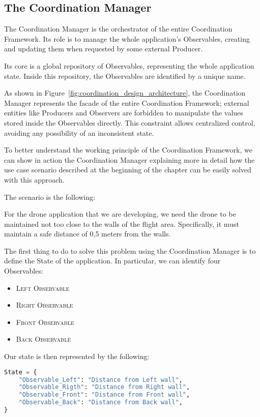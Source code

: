 \subsection{The Coordination Manager}\label{subsec:coordination_manager}

The Coordination Manager is the orchestrator of the entire Coordination Framework. 
Its role is to manage the whole application's Observables, creating and updating them when requested by some external Producer.

Its core is a global repository of Observables, representing the whole application state. 
Inside this repository, the Observables are identified by a unique name. 

As shown in Figure~\ref{fig:coordination_design_architecture}, the Coordination Manager represents the facade of the entire Coordination Framework; external entities like Producers and Observers are forbidden to manipulate the values stored inside the Observables directly.
This constraint allows centralized control, avoiding any possibility of an inconsistent state.

To better understand the working principle of the Coordination Framework, we can show in action the Coordination Manager explaining more in detail how the use case scenario described at the beginning of the chapter can be easily solved with this approach.

The scenario is the following:
\begin{displayquote}
    For the drone application that we are developing, we need the drone to be maintained not too close to the walls of the flight area. 
    Specifically, it must maintain a safe distance of 0,5 meters from the walls.
\end{displayquote}

The first thing to do to solve this problem using the Coordination Manager is to define the State of the application. 
In particular, we can identify four Observables:
\begin{itemize}
    \item \textsc{Left Observable} 
    \item \textsc{Right Observable} 
    \item \textsc{Front Observable} 
    \item \textsc{Back Observable}
\end{itemize}

Our state is then represented by the following:

\begin{lstlisting}[language=Python]
State = {
    "Observable_Left": "Distance from Left wall",
    "Observable_Rigth": "Distance from Right wall",
    "Observable_Front": "Distance from Front wall",
    "Observable_Back": "Distance from Back wall",
}
\end{lstlisting}


